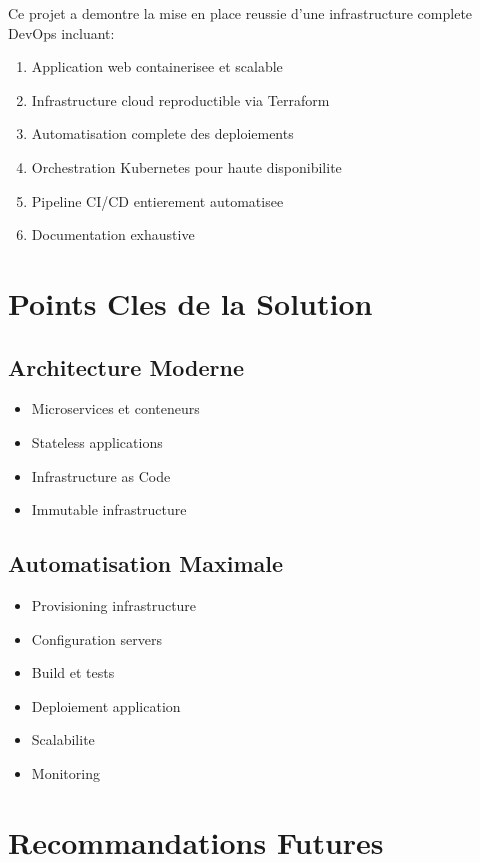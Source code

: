 \documentclass[12pt,a4paper]{report}
\begin{document}
Ce projet a demontre la mise en place reussie d'une infrastructure complete DevOps incluant:

\begin{enumerate}
    \item Application web containerisee et scalable
    \item Infrastructure cloud reproductible via Terraform
    \item Automatisation complete des deploiements
    \item Orchestration Kubernetes pour haute disponibilite
    \item Pipeline CI/CD entierement automatisee
    \item Documentation exhaustive
\end{enumerate}

\section{Points Cles de la Solution}

\subsection{Architecture Moderne}

\begin{itemize}
    \item Microservices et conteneurs
    \item Stateless applications
    \item Infrastructure as Code
    \item Immutable infrastructure
\end{itemize}

\subsection{Automatisation Maximale}

\begin{itemize}
    \item Provisioning infrastructure
    \item Configuration servers
    \item Build et tests
    \item Deploiement application
    \item Scalabilite
    \item Monitoring
\end{itemize}

\section{Recommandations Futures}
\end{document}

